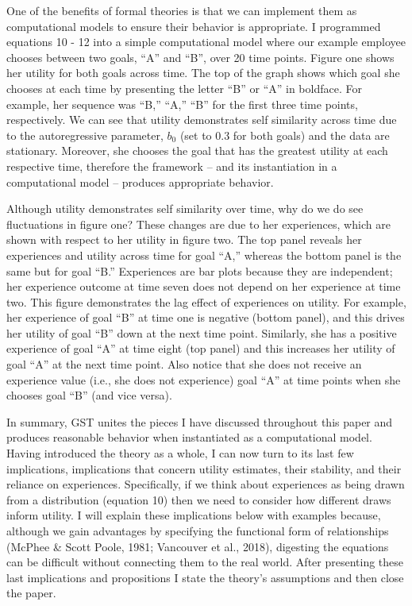 \documentclass[english,,man]{apa6}
\theoremstyle{definition}
\theoremstyle{definition}
\theoremstyle{definition}
\theoremstyle{remark}
\begin{document}
One of the benefits of formal theories is that we can implement them as
computational models to ensure their behavior is appropriate. I
programmed equations 10 - 12 into a simple computational model where our
example employee chooses between two goals, \enquote{A} and \enquote{B},
over 20 time points. Figure one shows her utility for both goals across
time. The top of the graph shows which goal she chooses at each time by
presenting the letter \enquote{B} or \enquote{A} in boldface. For
example, her sequence was \enquote{B,} \enquote{A,} \enquote{B} for the
first three time points, respectively. We can see that utility
demonstrates self similarity across time due to the autoregressive
parameter, \(b_0\) (set to 0.3 for both goals) and the data are
stationary. Moreover, she chooses the goal that has the greatest utility
at each respective time, therefore the framework -- and its
instantiation in a computational model -- produces appropriate behavior.

Although utility demonstrates self similarity over time, why do we do
see fluctuations in figure one? These changes are due to her
experiences, which are shown with respect to her utility in figure two.
The top panel reveals her experiences and utility across time for goal
\enquote{A,} whereas the bottom panel is the same but for goal
\enquote{B.} Experiences are bar plots because they are independent; her
experience outcome at time seven does not depend on her experience at
time two. This figure demonstrates the lag effect of experiences on
utility. For example, her experience of goal \enquote{B} at time one is
negative (bottom panel), and this drives her utility of goal \enquote{B}
down at the next time point. Similarly, she has a positive experience of
goal \enquote{A} at time eight (top panel) and this increases her
utility of goal \enquote{A} at the next time point. Also notice that she
does not receive an experience value (i.e., she does not experience)
goal \enquote{A} at time points when she chooses goal \enquote{B} (and
vice versa).

In summary, GST unites the pieces I have discussed throughout this paper
and produces reasonable behavior when instantiated as a computational
model. Having introduced the theory as a whole, I can now turn to its
last few implications, implications that concern utility estimates,
their stability, and their reliance on experiences. Specifically, if we
think about experiences as being drawn from a distribution (equation 10)
then we need to consider how different draws inform utility. I will
explain these implications below with examples because, although we gain
advantages by specifying the functional form of relationships (McPhee \&
Scott Poole, 1981; Vancouver et al., 2018), digesting the equations can
be difficult without connecting them to the real world. After presenting
these last implications and propositions I state the theory's
assumptions and then close the paper.
\end{document}
